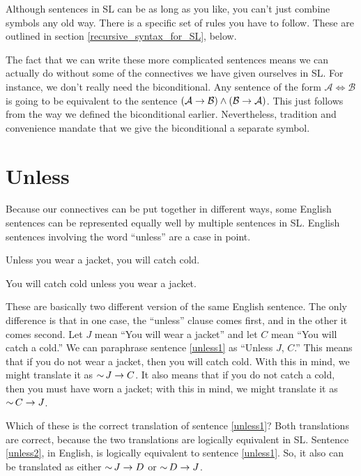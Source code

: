 Although sentences in SL can be as long as you like, you can't just combine symbols any old way. There is a specific set of rules you have to follow. These are outlined in section \ref{recursive_syntax_for_SL}, below.

The fact that we can write these more complicated sentences means we can actually do without some of the connectives we have given ourselves in SL. For instance, we don't really need the biconditional. Any sentence of the form $\mathcal{A} \iff \mathcal{B}$ is going to be equivalent to the sentence $(\mathcal{A} \mathrel{\rightarrow} \mathcal{B}) \land (\mathcal{B} \mathrel{\rightarrow} \mathcal{A})$. This just follows from the way we defined the biconditional earlier. Nevertheless, tradition and convenience mandate that we give the biconditional a separate symbol.

\section{Unless}

Because our connectives can be put together in different ways, some English sentences can be represented equally well by multiple sentences in SL. English sentences involving the word ``unless'' are a case in point.

\begin{kormanize}
\item[\label{unless1}] Unless you wear a jacket, you will catch cold.
\item[\label{unless2}] You will catch cold unless you wear a jacket.
\end{kormanize}

These are basically two different version of the same English sentence. The only difference is that in one case, the ``unless'' clause comes first, and in the other it comes second. Let $J$ mean ``You will wear a jacket'' and let $C$ mean ``You will catch a cold.'' We can paraphrase sentence \ref{unless1} as ``Unless $J$, $C$.'' This means that if you do not wear a jacket, then you will catch cold. With this in mind, we might translate it as $\mathop{\sim} J \mathrel{\rightarrow} C$. It also means that if you do not catch a cold, then you must have worn a jacket; with this in mind, we might translate it as $\mathop{\sim} C \mathrel{\rightarrow} J$.

Which of these is the correct translation of sentence \ref{unless1}? Both translations are correct, because the two translations are logically equivalent in SL. Sentence \ref{unless2}, in English, is logically equivalent to sentence \ref{unless1}. So, it also can be translated as either $\mathop{\sim} J \mathrel{\rightarrow} D$ or $\mathop{\sim} D \mathrel{\rightarrow} J$.

